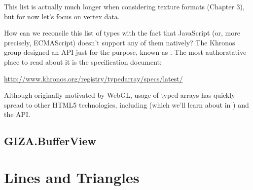 This list is actually much longer when considering texture formats (Chapter 3), but for now let's focus on vertex data.

How can we reconcile this list of types with the fact that JavaScript (or, more precisely, ECMAScript) doesn't support any of them natively?  The Khronos group designed an API just for the purpose, known as  .  The most authoratative place to read about it is the specification document:

\url{http://www.khronos.org/registry/typedarray/specs/latest/}

Although originally motivated by WebGL, usage of typed arrays has quickly spread to other HTML5 technologies, including  (which we'll learn about in ) and the  API.


\subsection{GIZA.BufferView}

\section{Lines and Triangles}

